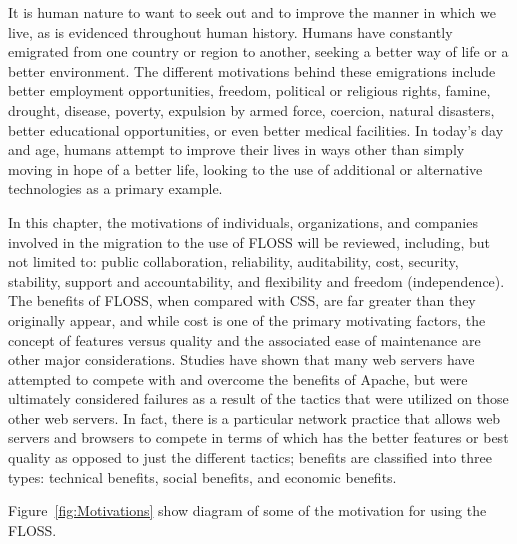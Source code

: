  
 It is human nature to want to seek out and to improve the manner in which we live, as is evidenced throughout human history. Humans have constantly emigrated from one country or region to another, seeking a better way of life or a better environment. The different motivations behind these emigrations include better employment opportunities, freedom, political or religious rights, famine, drought, disease, poverty, expulsion by armed force, coercion, natural disasters, better educational opportunities, or even better medical facilities.  In today’s day and age, humans attempt to improve their lives in ways other than simply moving in hope of a better life, looking to the use of additional or alternative technologies as a primary example.
 
\newpage

 In this chapter, the motivations of individuals, organizations, and companies involved in the migration to the use of FLOSS will be reviewed, including, but not limited to: public collaboration, reliability, auditability, cost, security, stability, support and accountability, and flexibility and freedom (independence). The benefits of FLOSS, when compared with CSS, are far greater than they originally appear, and while cost is one of the primary motivating factors, the concept of features versus quality and the associated ease of maintenance are other major considerations. Studies have shown that many web servers have attempted to compete with and overcome the benefits of Apache, but were ultimately considered failures as a result of the tactics that were utilized on those other web servers. In fact, there is a particular network practice that allows web servers and browsers to compete in terms of which has the better features or best quality as opposed to just the different tactics; benefits are classified into three types: technical benefits, social benefits, and economic benefits.

 Figure~\ref{fig:Motivations}  show  diagram of some of the motivation for using the FLOSS.

